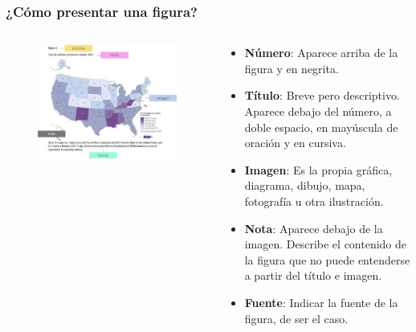 \documentclass[
11pt, %
]{beamer}
\begin{document}
\begin{frame}
	\frametitle{¿Cómo presentar una figura?}

	\begin{columns}[c] %
		\begin{column}{0.5\textwidth} %
			\begin{figure}
				\centering
				\includegraphics[width=1\linewidth]{images/screenshot005}
			\end{figure}

		\end{column}
		\begin{column}{0.5\textwidth} %
			\scriptsize
			\begin{itemize}
				\item \textbf{Número}: Aparece arriba de la figura y en negrita.
				\item \textbf{Título}: Breve pero descriptivo. Aparece debajo del número, a doble espacio, en mayúscula de oración y en cursiva.
				\item \textbf{Imagen}: Es la propia gráfica, diagrama, dibujo, mapa, fotografía u otra ilustración.
				\item \textbf{Nota}: Aparece debajo de la imagen. Describe el contenido de la figura que no puede entenderse a partir del título e imagen.
				\item \textbf{Fuente}: Indicar la fuente de la figura, de ser el caso.
			\end{itemize}

		\end{column}
	\end{columns}

\end{frame}
\end{document}
